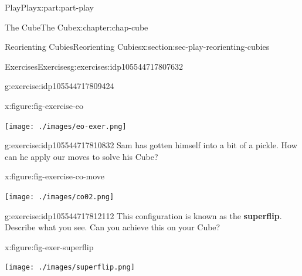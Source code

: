 \documentclass[oneside,10pt,]{book}
\newcommand{\terminology}[1]{\textbf{#1}}
\numberwithin{equation}{section}
\begin{document}
\begin{partptx}{Play}{}{Play}{}{}{x:part:part-play}
\begin{chapterptx}{The Cube}{}{The Cube}{}{}{x:chapter:chap-cube}
\begin{sectionptx}{Reorienting Cubies}{}{Reorienting Cubies}{}{}{x:section:sec-play-reorienting-cubies}
\begin{exercises-subsection-numberless}{Exercises}{}{Exercises}{}{}{g:exercises:idp105544717807632}
\begin{divisionexercise}{2}{}{}{g:exercise:idp105544717809424}
\begin{figureptx}{}{x:figure:fig-exercise-eo}{}
\begin{image}{0.25}{0.5}{0.25}%
\texttt{[image: ./images/eo-exer.png]}
\end{image}%
\tcblower
\end{figureptx}%
\end{divisionexercise}%
\begin{divisionexercise}{3}{}{}{g:exercise:idp105544717810832}%
Sam has gotten himself into a bit of a pickle. How can he apply our moves to solve his Cube?%
\begin{figureptx}{}{x:figure:fig-exercise-co-move}{}%
\begin{image}{0.25}{0.5}{0.25}%
\texttt{[image: ./images/co02.png]}
\end{image}%
\tcblower
\end{figureptx}%
\end{divisionexercise}%
\begin{divisionexercise}{4}{}{}{g:exercise:idp105544717812112}%
This configuration is known as the \terminology{superflip}. Describe what you see. Can you achieve this on your Cube?%
\begin{figureptx}{}{x:figure:fig-exer-superflip}{}%
\begin{image}{0.25}{0.5}{0.25}%
\texttt{[image: ./images/superflip.png]}
\end{image}%
\tcblower
\end{figureptx}%
\end{divisionexercise}%
\end{exercises-subsection-numberless}
\end{sectionptx}
\end{chapterptx}
\end{partptx}
%
%
\typeout{************************************************}
\typeout{************************************************}
%
\end{document}

